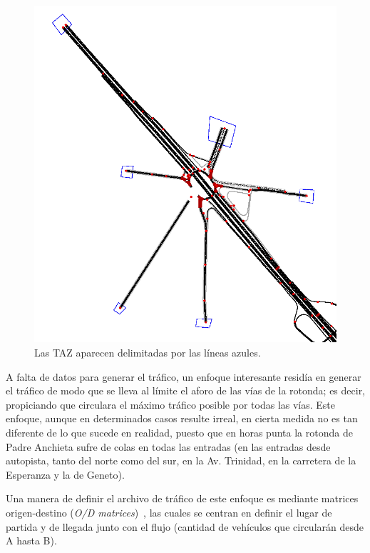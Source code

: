 \begin{figure}
    \centering
    \includegraphics[width=\linewidth]{report/images/taz.png}
    \caption{Las TAZ aparecen delimitadas por las líneas azules.}
    \label{fig:taz}
\end{figure}


A falta de datos para generar el tráfico, un enfoque interesante residía en generar el tráfico de modo que se lleva al límite el aforo de las vías de la rotonda; es decir, propiciando que circulara el máximo tráfico posible por todas las vías. Este enfoque, aunque en determinados casos resulte irreal, en cierta medida no es tan diferente de lo que sucede en realidad, puesto que en horas punta la rotonda de Padre Anchieta sufre de colas en todas las entradas (en las entradas desde autopista, tanto del norte como del sur, en la Av. Trinidad, en la carretera de la Esperanza y la de Geneto).

Una manera de definir el archivo de tráfico de este enfoque es mediante matrices origen-destino (\textit{O/D matrices})~\cite{otto_anker_nielsen_two_1998}, las cuales se centran en definir el lugar de partida y de llegada junto con el flujo (cantidad de vehículos que circularán desde A hasta B).

